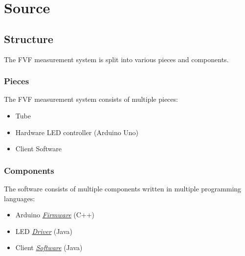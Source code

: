 \part{Source}

\chapter{Structure}
\label{source/structure::doc}\label{source/structure:issue}\label{source/structure:structure}
The FVF measurement system is split into various pieces and components.


\section{Pieces}
\label{source/structure:pieces}
The FVF measurement system consists of multiple pieces:
\begin{itemize}
\item {}
Tube

\item {}
Hardware LED controller (Arduino Uno)

\item {}
Client Software

\end{itemize}


\section{Components}
\label{source/structure:components}
The software consists of multiple components written in multiple programming languages:
\begin{itemize}
\item {}
Arduino {\hyperref[source/firmware::doc]{\emph{\emph{Firmware}}}} (C++)

\item {}
LED {\hyperref[source/driver::doc]{\emph{\emph{Driver}}}} (Java)

\item {}
Client {\hyperref[source/software::doc]{\emph{\emph{Software}}}} (Java)

\end{itemize}


